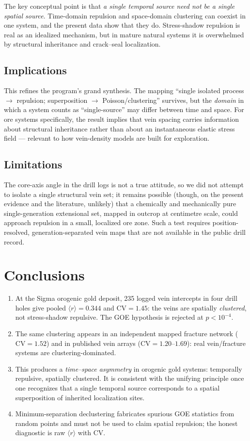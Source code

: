 \documentclass[11pt]{article}
\begin{document}
The key conceptual point is that \emph{a single temporal source need not be a
single spatial source}. Time-domain repulsion and space-domain clustering can
coexist in one system, and the present data show that they do. Stress-shadow
repulsion is real as an idealized mechanism, but in mature natural systems it is
overwhelmed by structural inheritance and crack--seal localization.

\subsection{Implications}
This refines the program's grand synthesis. The mapping ``single isolated
process $\rightarrow$ repulsion; superposition $\rightarrow$ Poisson/clustering''
survives, but the \emph{domain} in which a system counts as ``single-source'' may
differ between time and space. For ore systems specifically, the result implies
that vein spacing carries information about structural inheritance rather than
about an instantaneous elastic stress field --- relevant to how vein-density
models are built for exploration.

\subsection{Limitations}
The core-axis angle in the drill logs is not a true attitude, so we did not
attempt to isolate a single structural vein set; it remains possible (though, on
the present evidence and the literature, unlikely) that a chemically and
mechanically pure single-generation extensional set, mapped in outcrop at
centimetre scale, could approach repulsion in a small, localized ore zone. Such
a test requires position-resolved, generation-separated vein maps that are not
available in the public drill record.

\section{Conclusions}
\begin{enumerate}
\item At the Sigma orogenic gold deposit, 235 logged vein intercepts in four
drill holes give pooled $\langle r\rangle=0.344$ and $\mathrm{CV}=1.45$: the
veins are spatially \emph{clustered}, not stress-shadow repulsive. The GOE
hypothesis is rejected at $p<10^{-4}$.
\item The same clustering appears in an independent mapped fracture network
($\mathrm{CV}=1.52$) and in published vein arrays ($\mathrm{CV}=1.20$--$1.69$):
real vein/fracture systems are clustering-dominated.
\item This produces a \emph{time--space asymmetry} in orogenic gold systems:
temporally repulsive, spatially clustered. It is consistent with the unifying
principle once one recognizes that a single temporal source corresponds to a
spatial superposition of inherited localization sites.
\item Minimum-separation declustering fabricates spurious GOE statistics from
random points and must not be used to claim spatial repulsion; the honest
diagnostic is raw $\langle r\rangle$ with CV.
\end{enumerate}
\end{document}
